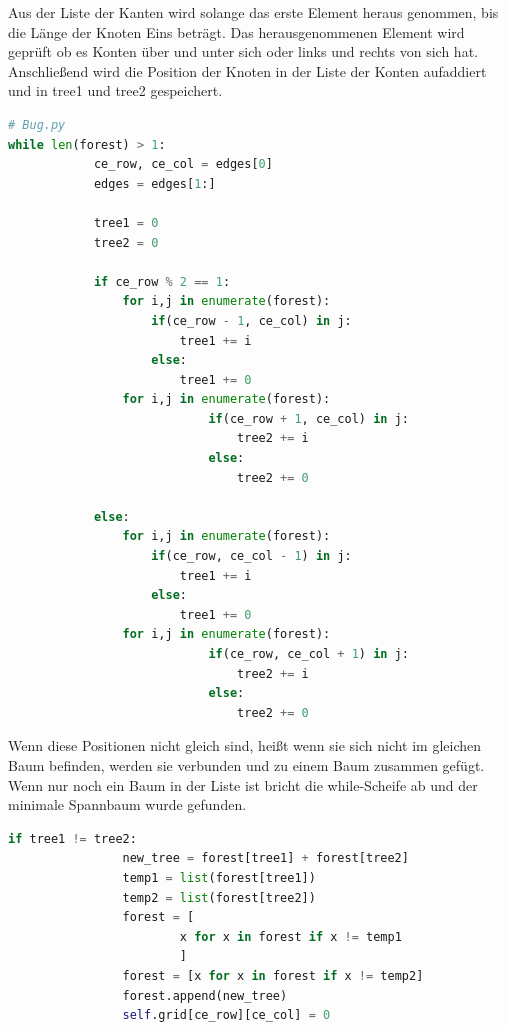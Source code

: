 \documentclass[11pt, a4paper]{article}
\begin{document}
Aus der Liste der Kanten wird solange das erste Element heraus genommen, bis die Länge der Knoten Eins beträgt. Das herausgenommenen Element wird geprüft ob es Konten über und unter sich oder links und rechts von sich hat. Anschließend wird die Position der Knoten in der Liste der Konten aufaddiert und in tree1 und tree2 gespeichert.

\begin{lstlisting}[language = Python]
# Bug.py
while len(forest) > 1:
            ce_row, ce_col = edges[0]
            edges = edges[1:]
        
            tree1 = 0
            tree2 = 0
        
            if ce_row % 2 == 1:
                for i,j in enumerate(forest):
                    if(ce_row - 1, ce_col) in j:
                        tree1 += i
                    else:
                        tree1 += 0
                for i,j in enumerate(forest):
                            if(ce_row + 1, ce_col) in j:
                                tree2 += i
                            else:
                                tree2 += 0
                
            else:
                for i,j in enumerate(forest):
                    if(ce_row, ce_col - 1) in j:
                        tree1 += i
                    else:
                        tree1 += 0
                for i,j in enumerate(forest):
                            if(ce_row, ce_col + 1) in j:
                                tree2 += i
                            else:
                                tree2 += 0
\end{lstlisting}

Wenn diese Positionen nicht gleich sind, heißt wenn sie sich nicht im gleichen Baum befinden, werden sie verbunden und zu einem Baum zusammen gefügt. Wenn nur noch ein Baum in der Liste ist bricht die while-Scheife ab und der minimale Spannbaum wurde gefunden.

\begin{lstlisting}[language = Python]
if tree1 != tree2:
                new_tree = forest[tree1] + forest[tree2]
                temp1 = list(forest[tree1])
                temp2 = list(forest[tree2])
                forest = [
                        x for x in forest if x != temp1
                        ]
                forest = [x for x in forest if x != temp2]
                forest.append(new_tree)
                self.grid[ce_row][ce_col] = 0
\end{lstlisting}
\end{document}
